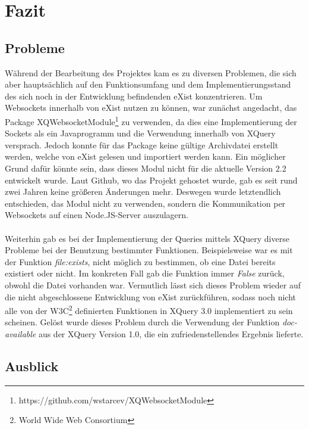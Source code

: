 \section{Fazit}

\subsection{Probleme}
Während der Bearbeitung des Projektes kam es zu diversen Problemen, die sich aber hauptsächlich auf den Funktionsumfang und dem Implementierungsstand des sich noch in der Entwicklung befindenden eXist konzentrieren. Um Websockets innerhalb von eXist nutzen zu können, war zunächst angedacht, das Package XQWebsocketModule\footnote[1]{https://github.com/wstarcev/XQWebsocketModule} zu verwenden, da dies eine Implementierung der Sockets als ein Javaprogramm und die Verwendung innerhalb von XQuery versprach. Jedoch konnte für das Package keine gültige Archivdatei erstellt werden, welche von eXist gelesen und importiert werden kann. Ein möglicher Grund dafür könnte sein, dass dieses Modul nicht für die aktuelle Version 2.2 entwickelt wurde. Laut Github, wo das Projekt gehostet wurde, gab es seit rund zwei Jahren keine größeren Änderungen mehr. Deswegen wurde letztendlich entschieden, das Modul nicht zu verwenden, sondern die Kommunikation per Websockets auf einen Node.JS-Server auszulagern.
\\
\\
Weiterhin gab es bei der Implementierung der Queries mittels XQuery diverse Probleme bei der Benutzung bestimmter Funktionen. Beispielsweise war es mit der Funktion \textit{file:exists}, nicht möglich zu bestimmen, ob eine Datei bereits existiert oder nicht. Im konkreten Fall gab die Funktion immer \textit{False} zurück, obwohl die Datei vorhanden war. Vermutlich lässt sich dieses Problem wieder auf die nicht abgeschlossene Entwicklung von eXist zurückführen, sodass noch nicht alle von der W3C\footnote[2]{World Wide Web Consortium} definierten Funktionen in XQuery 3.0 implementiert zu sein scheinen. Gelöst wurde dieses Problem durch die Verwendung der Funktion \textit{doc-available} aus der XQuery Version 1.0, die ein zufriedenstellendes Ergebnis lieferte.

\subsection{Ausblick}